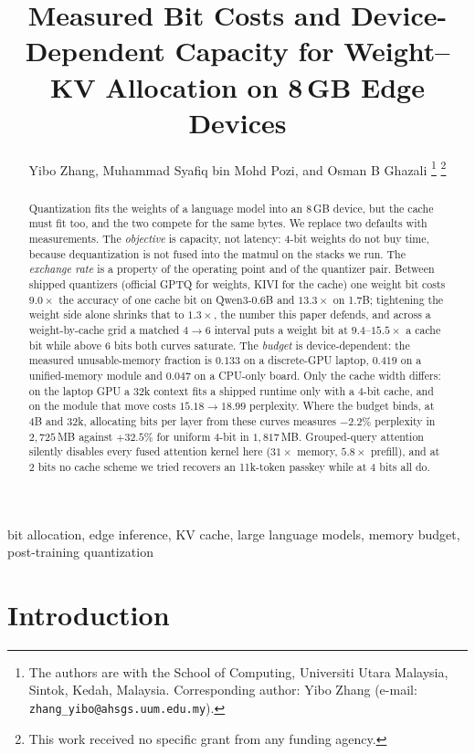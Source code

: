 \documentclass[10pt,journal]{IEEEtran}
\title{Measured Bit Costs and Device-Dependent Capacity for Weight--KV Allocation on 8\,GB Edge Devices}
\author{Yibo Zhang, Muhammad Syafiq bin Mohd Pozi, and Osman B Ghazali%
\thanks{The authors are with the School of Computing, Universiti Utara Malaysia,
Sintok, Kedah, Malaysia. Corresponding author: Yibo Zhang
(e-mail: \texttt{zhang\_yibo@ahsgs.uum.edu.my}).}%
\thanks{This work received no specific grant from any funding agency.}}
\begin{document}
\maketitle

\begin{abstract}
Quantization fits the weights of a language model into an 8\,GB device, but the cache
must fit too, and the two compete for the same bytes. We replace two defaults with
measurements. The \emph{objective} is capacity, not latency: 4-bit weights do not buy
time, because dequantization is not fused into the matmul on the stacks we run. The
\emph{exchange rate} is a property of the operating point and of the quantizer pair.
Between shipped quantizers (official GPTQ for weights, KIVI for the cache) one weight
bit costs $9.0\times$ the accuracy of one cache bit on Qwen3-0.6B and $13.3\times$ on
1.7B; tightening the weight side alone shrinks that to $1.3\times$, the number this
paper defends, and across a weight-by-cache grid a matched $4{\to}6$ interval puts a
weight bit at $9.4$--$15.5\times$ a cache bit while above 6 bits both curves saturate.
The \emph{budget} is device-dependent: the measured unusable-memory fraction is $0.133$
on a discrete-GPU laptop, $0.419$ on a unified-memory module and $0.047$ on a CPU-only
board. Only the cache width differs: on the laptop GPU a 32k context fits a shipped
runtime only with a 4-bit cache, and on the module that move costs $15.18\to18.99$
perplexity. Where the budget binds, at 4B and 32k, allocating bits per layer from these
curves measures $-2.2\%$ perplexity in $2{,}725$\,MB against $+32.5\%$ for uniform
4-bit in $1{,}817$\,MB. Grouped-query attention silently disables every fused attention
kernel here ($31\times$ memory, $5.8\times$ prefill), and at 2 bits no cache scheme we
tried recovers an 11k-token passkey while at 4 bits all do.
\end{abstract}

\begin{IEEEkeywords}
bit allocation, edge inference, KV cache, large language models,
memory budget, post-training quantization
\end{IEEEkeywords}

\section{Introduction}
\label{sec:intro}
\end{document}

